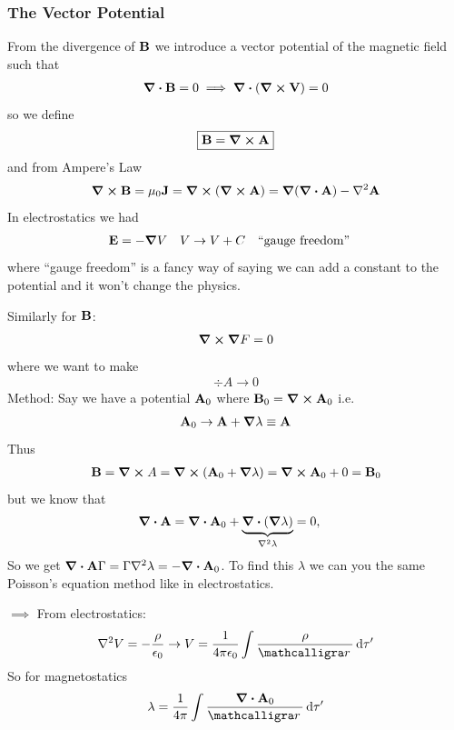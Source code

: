\documentclass[../main.tex]{subfiles}
\begin{document}
\subsubsection*{The Vector Potential}
From the divergence of $\vb B$ we introduce a vector potential of the magnetic field such that
\begin{align*}
    \div \vb B = 0 \implies \div (\curl \vb V) = 0
\end{align*}
so we define
\begin{align*}
    \boxed{
        \vb B = \curl \vb A
    }
\end{align*}
and from Ampere's Law
\begin{align*}
    \curl \vb B = \mu_0 \vb J = \curl (\curl \vb A) = \grad (\div \vb A) - \laplacian \vb A
\end{align*}
In electrostatics we had
\begin{align*}
    \vb E = - \grad V \quad V \to V + C \qqtext{``gauge freedom''}
\end{align*}
where ``gauge freedom'' is a fancy way of saying we can add a constant to the potential and it won't change the physics.

Similarly for $\vb B$:
\begin{align*}
    \curl \grad F = 0 
\end{align*}
where we want to make 
\begin{align*}
    \div A \to 0
\end{align*}
Method: Say we have a potential $\vb A_0$ where $\vb B_0 = \curl \vb A_0$ i.e.
\begin{align*}
    \vb A_0 \to \vb A + \grad \lambda \equiv \vb A
\end{align*}
Thus
\begin{align*}
    \vb B = \curl A = \curl (\vb A_0 + \grad \lambda) = \curl \vb A_0 + 0 = \vb B_0
\end{align*}
but we know that
\begin{align*}
    \div \vb A = \div \vb A_0 + \underbrace{\div(\grad \lambda)}_{\laplacian \lambda}= 0, \quad 
\end{align*}
So we get $\div \vb A \if \laplacian \lambda = - \div \vb A_0$. To find this $\lambda$ we can you the same Poisson's equation method like in electrostatics.

$\implies$ From electrostatics:
\begin{align*}
    \laplacian V = -\frac{\rho}{\epsilon_0} \to V = \ke \int \frac{\rho}{\scriptr} \dd{\tau'}
\end{align*}
So for magnetostatics
\begin{align*}
    \lambda = \frac{1}{4\pi} \int \frac{\div \vb A_0}{\scriptr} \dd{\tau'}
\end{align*}
\end{document}

